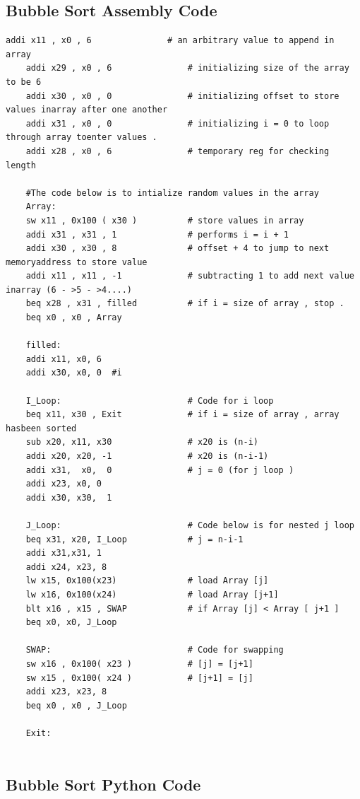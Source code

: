 \documentclass{article}
\begin{document}
\subsection{Bubble Sort Assembly Code} 
\begin{lstlisting}[caption={Bubble Sort Assembly code}, captionpos=b, language=RISC-V]
    addi x11 , x0 , 6 				# an arbitrary value to append in array
    addi x29 , x0 , 6 				# initializing size of the array to be 6
    addi x30 , x0 , 0 				# initializing offset to store values inarray after one another
    addi x31 , x0 , 0 				# initializing i = 0 to loop through array toenter values .
    addi x28 , x0 , 6 				# temporary reg for checking length
    
    #The code below is to intialize random values in the array
    Array:
    sw x11 , 0x100 ( x30 ) 			# store values in array
    addi x31 , x31 , 1 				# performs i = i + 1
    addi x30 , x30 , 8 				# offset + 4 to jump to next memoryaddress to store value
    addi x11 , x11 , -1 			# subtracting 1 to add next value inarray (6 - >5 - >4....)
    beq x28 , x31 , filled 			# if i = size of array , stop .
    beq x0 , x0 , Array
    
    filled:
    addi x11, x0, 6
    addi x30, x0, 0  #i
    
    I_Loop:                 	 	# Code for i loop
    beq x11, x30 , Exit    		 	# if i = size of array , array hasbeen sorted
    sub x20, x11, x30       		# x20 is (n-i)   
    addi x20, x20, -1       		# x20 is (n-i-1)
    addi x31,  x0,  0       		# j = 0 (for j loop )
    addi x23, x0, 0
    addi x30, x30,  1
    
    J_Loop:  						# Code below is for nested j loop
    beq x31, x20, I_Loop            # j = n-i-1
    addi x31,x31, 1
    addi x24, x23, 8
    lw x15, 0x100(x23) 				# load Array [j]
    lw x16, 0x100(x24)			    # load Array [j+1]
    blt x16 , x15 , SWAP 			# if Array [j] < Array [ j+1 ]
    beq x0, x0, J_Loop
    
    SWAP:							# Code for swapping
    sw x16 , 0x100( x23 ) 			# [j] = [j+1]
    sw x15 , 0x100( x24 ) 			# [j+1] = [j]
    addi x23, x23, 8
    beq x0 , x0 , J_Loop
    
    Exit:
    

\end{lstlisting}

\subsection{Bubble Sort Python Code}
\end{document}
